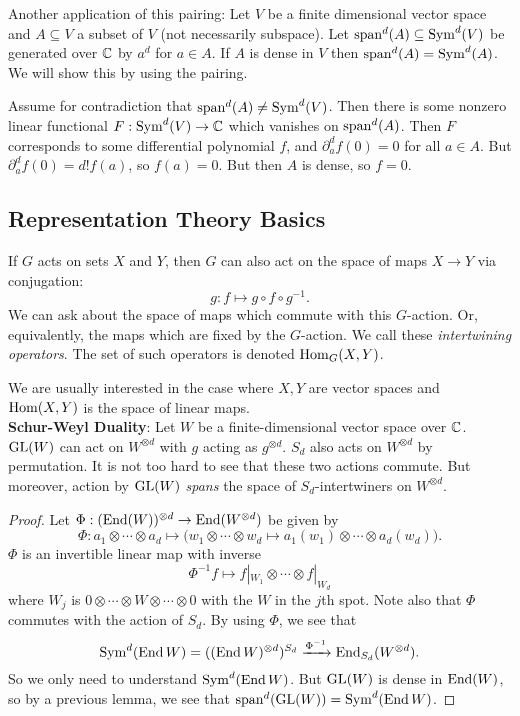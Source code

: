 \documentclass{amsart}
\begin{document}
Another application of this pairing:
Let $V$ be a finite dimensional vector space and $A\subseteq V$ a subset of $V$ (not necessarily subspace).
Let $\operatorname{span}^d(A)\subseteq \operatorname{Sym}^d(V)$ be generated over $\mathbb{C}$ by $a^d$ for $a\in A$.
If $A$ is dense in $V$ then $\operatorname{span}^d(A) = \operatorname{Sym}^d(A)$. 
We will show this by using the pairing.

Assume for contradiction that $\operatorname{span}^d(A)\neq \operatorname{Sym}^d(V)$. 
Then there is some nonzero linear functional $F:\operatorname{Sym}^d(V)\to \mathbb{C}$ which vanishes on $\operatorname{span}^d(A)$. 
Then $F$ corresponds to some differential polynomial $f$, and $\partial^d_a f(0) = 0$ for all $a\in A$.
But $\partial^d_af(0) = d!f(a)$, so $f(a)=0$. But then $A$ is dense, so $f=0$.\\

\subsection{Representation Theory Basics}
 
If $G$ acts on sets $X$ and $Y$, then $G$ can also act on the space of maps $X\to Y$ via conjugation:
$$
g: f \mapsto g\circ f \circ g^{-1}.
$$
We can ask about the space of maps which commute with this $G$-action. Or, equivalently, the maps which are fixed by the $G$-action. 
We call these \textit{intertwining operators}. 
The set of such operators is denoted $\operatorname{Hom}_G(X,Y)$. 

We are usually interested in the case where $X,Y$ are vector spaces and $\operatorname{Hom}(X,Y)$ is the space of linear maps.\\

\noindent \textbf{Schur-Weyl Duality}: 
Let $W$ be a finite-dimensional vector space over $\mathbb{C}$.
$\operatorname{GL}(W)$ can act on $W^{\otimes d}$ with $g$ acting as $g^{\otimes d}$.
$S_d$ also acts on $W^{\otimes d}$ by permutation.
It is not too hard to see that these two actions commute.
But moreover, action by $\operatorname{GL}(W)$ \textit{spans} the space of $S_d$-intertwiners on $W^{\otimes d}$.

\begin{proof}
	Let $\Phi:(\operatorname{End}(W))^{\otimes d}\to \operatorname{End}(W^{\otimes d})$ be given by
	$$
	\Phi: a_1\otimes \cdots \otimes a_d \mapsto \big(w_1\otimes \cdots \otimes w_d \mapsto a_1(w_1)\otimes \cdots \otimes a_d(w_d)\big).
	$$
	$\Phi$ is an invertible linear map with inverse
	$$
	\Phi^{-1} f \mapsto f|_{W_1}\otimes \cdots \otimes f|_{W_d}
	$$ 
	where $W_j$ is $0 \otimes \cdots \otimes W \otimes \cdots \otimes 0$ with the $W$ in the $j$th spot.
	Note also that $\Phi$ commutes with the action of $S_d$. By using $\Phi$, we see that 
	$$
	\operatorname{Sym}^d(\operatorname{End} W) = ((\operatorname{End} W)^{\otimes d})^{S_d} \xrightarrow{\Phi^{-1}} \operatorname{End}_{S_d}(W^{\otimes d}).
	$$
	So we only need to understand $\operatorname{Sym}^d(\operatorname{End} W)$. But $\operatorname{GL}(W)$ is dense in $\operatorname{End}(W)$, so by a previous lemma, we see that $\operatorname{span}^d(\operatorname{GL}(W))=\operatorname{Sym}^d(\operatorname{End} W)$.
\end{proof}\\
\end{document}
